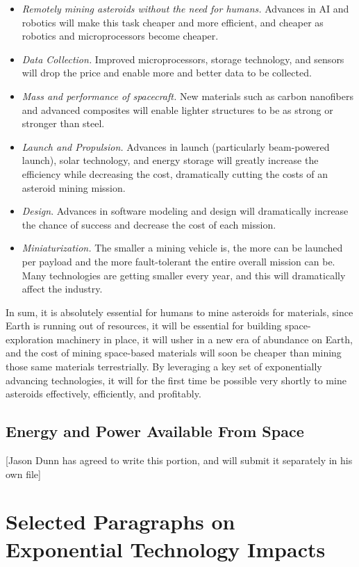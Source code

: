 \documentclass[english]{article}
\begin{document}
\begin{itemize}
\item \emph{Remotely mining asteroids without the need for humans. }Advances
in AI and robotics will make this task cheaper and more efficient,
and cheaper as robotics and microprocessors become cheaper.
\item \emph{Data Collection. }Improved microprocessors, storage technology,
and sensors will drop the price and enable more and better data to
be collected. 
\item \emph{Mass and performance of spacecraft.} New materials such as carbon
nanofibers and advanced composites will enable lighter structures
to be as strong or stronger than steel.
\item \emph{Launch and Propulsion. }Advances in launch (particularly beam-powered
launch), solar technology, and energy storage will greatly increase
the efficiency while decreasing the cost, dramatically cutting the
costs of an asteroid mining mission.
\item \emph{Design}. Advances in software modeling and design will dramatically
increase the chance of success and decrease the cost of each mission.
\item \emph{Miniaturization. }The smaller a mining vehicle is, the more
can be launched per payload and the more fault-tolerant the entire
overall mission can be. Many technologies are getting smaller every
year, and this will dramatically affect the industry.
\end{itemize}

In sum, it is absolutely essential for humans to mine asteroids for
materials, since Earth is running out of resources, it will be essential
for building space-exploration machinery in place, it will usher in
a new era of abundance on Earth, and the cost of mining space-based
materials will soon be cheaper than mining those same materials terrestrially.
By leveraging a key set of exponentially advancing technologies, it
will for the first time be possible very shortly to mine asteroids
effectively, efficiently, and profitably.


\subsection{Energy and Power Available From Space}

{[}Jason Dunn has agreed to write this portion, and will submit it
separately in his own file{]}


\section{Selected Paragraphs on Exponential Technology Impacts}
\end{document}
